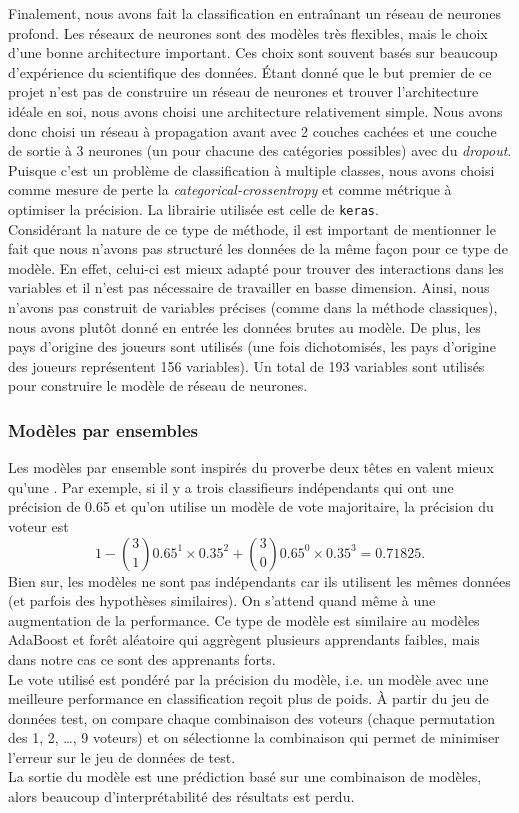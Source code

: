 Finalement, nous avons fait la classification en entraînant un réseau de neurones profond. Les réseaux de neurones sont des modèles très flexibles, mais le choix d'une bonne architecture important. Ces choix sont souvent basés sur beaucoup d'expérience du scientifique des données. Étant donné que le but premier de ce projet n'est pas de construire un réseau de neurones et trouver l'architecture idéale en soi, nous avons choisi une architecture relativement simple. Nous avons donc choisi un réseau à propagation avant avec 2 couches cachées et une couche de sortie à 3 neurones (un pour chacune des catégories possibles) avec du \textit{dropout}. Puisque c'est un problème de classification à multiple classes, nous avons choisi comme mesure de perte la \textit{categorical-crossentropy} et comme métrique à optimiser la précision. La librairie utilisée est celle de \texttt{keras}.\\

Considérant la nature de ce type de méthode, il est important de mentionner le fait que nous n'avons pas structuré les données de la même façon pour ce type de modèle. En effet, celui-ci est mieux adapté pour trouver des interactions dans les variables et il n'est pas nécessaire de travailler en basse dimension. Ainsi, nous n'avons pas construit de variables précises (comme dans la méthode classiques), nous avons plutôt donné en entrée les données brutes au modèle. De plus, les pays d'origine des joueurs sont utilisés (une fois dichotomisés, les pays d'origine des joueurs représentent 156 variables). Un total de 193 variables sont utilisés pour construire le modèle de réseau de neurones.

\subsubsection{Modèles par ensembles}

Les modèles par ensemble sont inspirés du proverbe \guillemotleft deux têtes en valent mieux qu'une \guillemotright. Par exemple, si il y a trois classifieurs indépendants qui ont une précision de 0.65 et qu'on utilise un modèle de vote majoritaire, la précision du voteur est 
$$1 - \binom{3}{1}0.65^1\times 0.35^2 + \binom{3}{0}0.65^0\times 0.35^3 = 0.71825.$$
Bien sur, les modèles ne sont pas indépendants car ils utilisent les mêmes données (et parfois des hypothèses similaires). On s'attend quand même à une augmentation de la performance. Ce type de modèle est similaire au modèles AdaBoost et forêt aléatoire qui aggrègent plusieurs apprendants faibles, mais dans notre cas ce sont des apprenants forts.\\

Le vote utilisé est pondéré par la précision du modèle, i.e. un modèle avec une meilleure performance en classification reçoit plus de poids. À partir du jeu de données test, on compare chaque combinaison des voteurs (chaque permutation des 1, 2, \dots, 9 voteurs) et on sélectionne la combinaison qui permet de minimiser l'erreur sur le jeu de données de test.\\

La sortie du modèle est une prédiction basé sur une combinaison de modèles, alors beaucoup d'interprétabilité des résultats est perdu.
